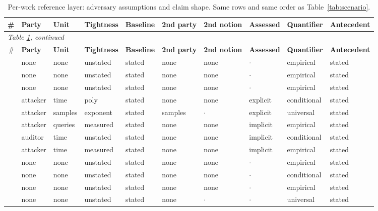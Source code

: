\begin{landscape}
\begingroup\scriptsize\setlength{\tabcolsep}{4pt}
\begin{longtable}{rlllllllll}
\caption{Per-work reference layer: adversary assumptions and claim shape. Same rows and same order as Table~\ref{tab:scenario}.}\label{tab:adversary}\\
\toprule \# & \textbf{Party} & \textbf{Unit} & \textbf{Tightness} & \textbf{Baseline} & \textbf{2nd party} & \textbf{2nd notion} & \textbf{Assessed} & \textbf{Quantifier} & \textbf{Antecedent} \\ \midrule\endfirsthead
\multicolumn{10}{l}{\emph{Table \ref{tab:adversary}, continued}}\\
\toprule \# & \textbf{Party} & \textbf{Unit} & \textbf{Tightness} & \textbf{Baseline} & \textbf{2nd party} & \textbf{2nd notion} & \textbf{Assessed} & \textbf{Quantifier} & \textbf{Antecedent} \\ \midrule\endhead
\bottomrule\endfoot
\cite{DZT25} & none & none & unstated & stated & none & none & $\cdot$ & empirical & stated \\
\cite{RL21} & none & none & unstated & stated & none & none & $\cdot$ & empirical & stated \\
\cite{DSMMSZTCEH24} & none & none & unstated & stated & none & none & $\cdot$ & empirical & stated \\
\cite{VDKMR26} & attacker & time & poly & stated & none & none & explicit & conditional & stated \\
\cite{HSU25} & attacker & samples & exponent & stated & samples & $\cdot$ & explicit & universal & stated \\
\cite{SSSS17} & attacker & queries & measured & stated & none & none & implicit & empirical & stated \\
\cite{ZDKT25} & auditor & time & unstated & stated & none & none & implicit & conditional & stated \\
\cite{CCNSTT22} & attacker & time & measured & stated & none & none & implicit & empirical & stated \\
\cite{AZT24} & none & none & unstated & stated & none & none & $\cdot$ & empirical & stated \\
\cite{YGFJ18} & none & none & unstated & stated & none & none & $\cdot$ & conditional & stated \\
\cite{MSJFRM25} & none & none & unstated & stated & none & none & $\cdot$ & empirical & stated \\
\cite{CHSS24} & none & none & unstated & stated & none & $\cdot$ & $\cdot$ & universal & stated \\

\end{longtable}
\end{landscape}
